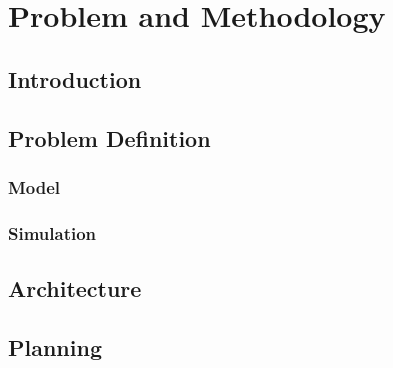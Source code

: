 \chapter{Problem and Methodology}\label{chap:method}

\section*{}

 

\section{Introduction}

\section{Problem Definition}

\subsection{Model}

\subsection{Simulation}

\section{Architecture}

\section{Planning}
